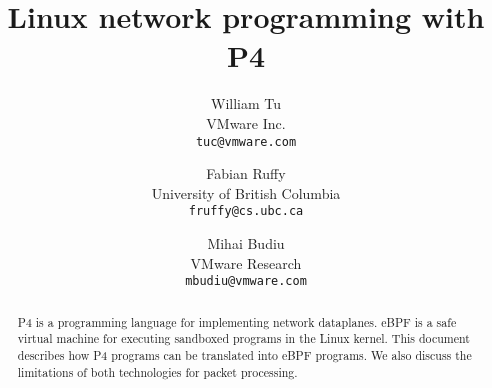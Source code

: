 \documentclass[9pt,twocolumn,times]{article}
\title{Linux network programming with P4}
\author{William Tu\\
  VMware Inc.\\
  \texttt{tuc@vmware.com}
  \and
  Fabian Ruffy\\
  University of British Columbia\\
  \texttt{fruffy@cs.ubc.ca}
  \and
  Mihai Budiu\\
  VMware Research\\
  \texttt{mbudiu@vmware.com}
}
\date{}
\begin{document}
\maketitle

\begin{abstract}
  P4 is a programming language for implementing network dataplanes.
  eBPF is a safe virtual machine for executing sandboxed programs in
  the Linux kernel.  This document describes how P4 programs can be
  translated into eBPF programs.  We also discuss the limitations of
  both technologies for packet processing.
\end{abstract}










\end{document}
